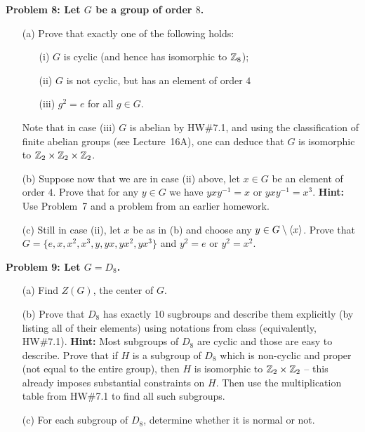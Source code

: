 \documentclass[11pt]{amsart}
\begin{document}
\bf{Problem 8: }\rm Let $G$ be a group of order $8$. 
\begin{itemize}
\item[(a)] Prove that exactly one of the following holds:
\begin{itemize}
\item[(i)] $G$ is cyclic (and hence has isomorphic to ${\mathbb Z}_8$);
\item[(ii)] $G$ is not cyclic, but has an element of order $4$
\item[(iii)] $g^2=e$ for all $g\in G$. 
\end{itemize}
Note that in case (iii) $G$ is abelian by HW\#7.1, and using the classification
of finite abelian groups (see Lecture~16A), one can deduce that $G$ is isomorphic to ${\mathbb Z}_2\times{\mathbb Z}_2\times {\mathbb Z}_2$.
 \item[(b)] Suppose now that we are in case (ii) above, let $x\in G$ be an element of order $4$. Prove
that for any $y\in G$ we have $yxy^{-1}=x$ or $yxy^{-1}=x^3$. 
{\bf Hint:} Use Problem~7 and a problem from an earlier homework.
\item[(c)] Still in case (ii), let $x$ be as in (b) and choose any $y\in G\setminus{\langle} x{\rangle} $. Prove that
$G=\{e,x,x^2,x^3,y,yx,yx^2,yx^3\}$ and $y^2=e$ or $y^2=x^2$.
\end{itemize}
\skv

\bf{Problem 9: }\rm Let $G=D_8$. 
\begin{itemize}
\item[(a)] Find $Z(G)$, the center of $G$.
\item[(b)] Prove that $D_8$ has exactly 10 sugbroups and describe them explicitly (by listing all of their elements) using notations from class (equivalently, HW\#7.1). {\bf Hint:} Most subgroups of $D_8$ are cyclic and those are easy to describe.
Prove that if $H$ is a subgroup of $D_8$ which is non-cyclic and proper (not equal to the entire group), then $H$ is isomorphic to ${\mathbb Z}_2\times {\mathbb Z}_2$ -- this already imposes substantial constraints on $H$. Then use the multiplication table
from HW\#7.1 to find all such subgroups.
\item[(c)] For each subgroup of $D_8$,
determine whether it is normal or not. 
\end{itemize}
\end{document}
